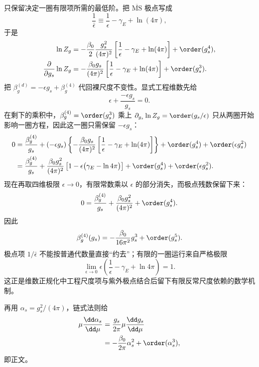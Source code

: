 \begin{derivation}[一圈强耦合演化与尺度参数]
只保留决定一圈有限项所需的最低阶。把 $\overline{\mathrm{MS}}$ 极点写成
\begin{equation*}
 \frac1{\bar\epsilon}
 \equiv
 \frac1\epsilon-\gamma_E+\ln(4\pi),
\end{equation*}
于是
\begin{align*}
\ln Z_g
&=-\frac{\beta_0}{2}
\frac{g_s^2}{(4\pi)^2}
\left[\frac1\epsilon-\gamma_E+\ln(4\pi)\right]
+\order(g_s^4),\\
\frac{\partial}{\partial g_s}\ln Z_g
&=-\frac{\beta_0 g_s}{(4\pi)^2}
\left[\frac1\epsilon-\gamma_E+\ln(4\pi)\right]
+\order(g_s^3).
\end{align*}
把 $\beta_g^{(d)}=-\epsilon g_s+\beta_g^{(4)}$ 代回裸尺度不变性。显式工程维数先给
\begin{equation*}
 \epsilon+\frac{-\epsilon g_s}{g_s}=0.
\end{equation*}
在剩下的乘积中，$\beta_g^{(4)}=\order(g_s^3)$ 乘上 $\partial_{g_s}\ln Z_g=\order(g_s/\epsilon)$ 只从两圈开始影响一圈方程，因此这一圈只需保留 $-\epsilon g_s$：
\begin{align*}
0
={}&\frac{\beta_g^{(4)}}{g_s}
+(-\epsilon g_s)
\left\{-\frac{\beta_0 g_s}{(4\pi)^2}
\left[\frac1\epsilon-\gamma_E+\ln(4\pi)\right]\right\}
+\order(g_s^4)+\order(\epsilon g_s^2)\\
={}&\frac{\beta_g^{(4)}}{g_s}
+\frac{\beta_0g_s^2}{(4\pi)^2}
\left[1-\epsilon\bigl(\gamma_E-\ln4\pi\bigr)\right]
+\order(g_s^4)+\order(\epsilon g_s^2).
\end{align*}
现在再取四维极限 $\epsilon\to0$，有限常数乘以 $\epsilon$ 的部分消失，而极点残数保留下来：
\begin{equation*}
0=\frac{\beta_g^{(4)}}{g_s}
+\frac{\beta_0g_s^2}{(4\pi)^2}
+\order(g_s^4).
\end{equation*}
因此
\begin{equation*}
{
\beta_g^{(4)}(g_s)
=-\frac{\beta_0}{16\pi^2}g_s^3
+\order(g_s^5).}
\end{equation*}
极点项 $1/\bar\epsilon$ 不能按普通代数量直接“约去”；有限的一圈运行来自严格极限
\begin{equation*}
 \lim_{\epsilon\to0}
 \epsilon\left(\frac1\epsilon-\gamma_E+\ln4\pi\right)=1.
\end{equation*}
这正是维数正规化中工程尺度项与紫外极点结合后留下有限反常尺度依赖的数学机制。

再用 \(\alpha_s=g_s^2/(4\pi)\)，链式法则给
\begin{align*}
\mu\frac{\dd\alpha_s}{\dd\mu}
&=\frac{g_s}{2\pi}
\mu\frac{\dd g_s}{\dd\mu}\\
&=-\frac{\beta_0}{2\pi}\alpha_s^2
+\order(\alpha_s^3),
\end{align*}
即正文。


\end{derivation}
